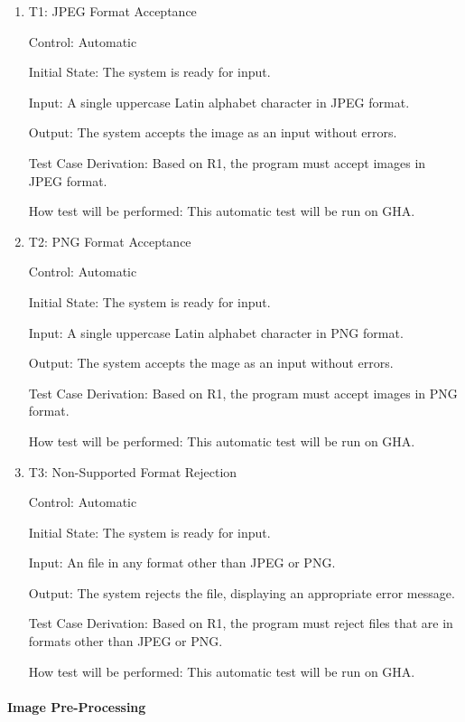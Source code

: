 \documentclass[12pt, titlepage]{article}
\begin{document}
\begin{enumerate}

\item{T1: JPEG Format Acceptance\\}

Control: Automatic

Initial State: The \progname{} system is ready for input.

Input: A single uppercase Latin alphabet character in JPEG format.

Output: The system accepts the image as an input without errors.

Test Case Derivation: Based on R1, the program must accept images in JPEG
format.

How test will be performed: This automatic test will be run on GHA.

\item{T2: PNG Format Acceptance\\}

Control: Automatic

Initial State: The \progname{} system is ready for input.

Input: A single uppercase Latin alphabet character in PNG format.

Output: The system accepts the mage as an input without errors.

Test Case Derivation: Based on R1, the program must accept images in PNG format.

How test will be performed: This automatic test will be run on GHA.

\item{T3: Non-Supported Format Rejection \\}

Control: Automatic

Initial State: The \progname{} system is ready for input.

Input: An file in any format other than JPEG or PNG.

Output: The system rejects the file, displaying an appropriate error message.

Test Case Derivation: Based on R1, the program must reject files that are in
formats other than JPEG or PNG.

How test will be performed: This automatic test will be run on GHA.

\end{enumerate}

\paragraph{Image Pre-Processing}
\end{document}
